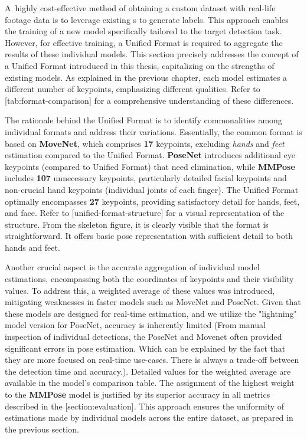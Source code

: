 A~highly cost-effective method of obtaining a custom dataset with real-life footage data is to leverage existing \NN\-s to generate labels. This approach enables the training of a new model specifically tailored to the target detection task. However, for effective training, a Unified Format is required to aggregate the results of these individual models. This section precisely addresses the concept of a Unified Format introduced in this thesis, capitalizing on the strengths of existing models. As explained in the previous chapter, each model estimates a different number of keypoints, emphasizing different qualities. Refer to [tab:format-comparison] for a comprehensive understanding of these differences.

The rationale behind the Unified Format is to identify commonalities among individual formats and address their variations. Essentially, the common format is based on {\bf MoveNet}, which comprises {\bf 17} keypoints, excluding {\em hands} and {\em feet} estimation compared to the Unified Format. {\bf PoseNet} introduces additional eye keypoints (compared to Unified Format) that need elimination, while {\bf MMPose} includes {\bf 107} unnecessary keypoints, particularly detailed facial keypoints and non-crucial hand keypoints (individual joints of each finger). The Unified Format optimally encompasses {\bf 27} keypoints, providing satisfactory detail for hands, feet, and face. Refer to [unified-format-structure] for a visual representation of the structure. From the skeleton figure, it is clearly visible that the format is straightforward. It offers basic pose representation with sufficient detail to both hands and feet.

Another crucial aspect is the accurate aggregation of individual model estimations, encompassing both the coordinates of keypoints and their visibility values. To address this, a weighted average of these values was introduced, mitigating weaknesses in faster models such as MoveNet and PoseNet. Given that these models are designed for real-time estimation, and we utilize the "lightning" model version for PoseNet, accuracy is inherently limited (From manual inspection of individual detections, the PoseNet and Movenet often provided significant errors in pose estimation. Which can be explained by the fact that they are more focused on real-time use-cases. There is always a trade-off between the detection time and accuracy.). Detailed values for the weighted average are available in the model's comparison table. The assignment of the highest weight to the {\bf MMPose} model is justified by its superior accuracy in all metrics described in the [section:evaluation]. This approach ensures the uniformity of estimations made by individual models across the entire dataset, as prepared in the previous section.

